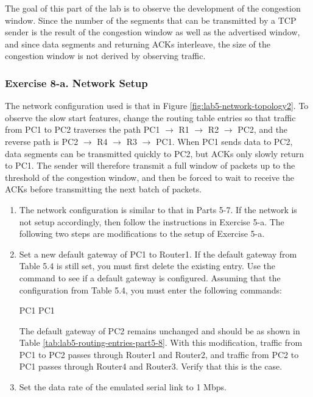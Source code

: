 The goal of this part of the lab is to observe the development of the congestion window. Since the number of the segments that can be transmitted by a TCP sender is the result of the congestion window as well as the advertised window, and since data segments and returning ACKs interleave, the size of the congestion window is not derived by observing traffic.

\subsubsection*{Exercise 8-a. Network Setup}

The network configuration used is that in Figure \ref{fig:lab5-network-topology2}. To observe the slow start features, change the routing table entries so that traffic from PC1 to PC2 traverses the path PC1 $\rightarrow$ R1 $\rightarrow$ R2 $\rightarrow$ PC2, and the reverse path is PC2 $\rightarrow$ R4 $\rightarrow$ R3 $\rightarrow$ PC1. When PC1 sends data to PC2, data segments can be transmitted quickly to PC2, but ACKs only slowly return to PC1. The sender will therefore transmit a full window of packets up to the threshold of the congestion window, and then be forced to wait to receive the ACKs before transmitting the next batch of packets.

\begin{enumerate}
	\item The network configuration is similar to that in Parts 5-7. If the network is not setup accordingly, then follow the instructions in Exercise 5-a. The following two steps are modifications to the setup of Exercise 5-a.
	\item Set a new default gateway of PC1 to Router1. If the default gateway from Table 5.4 is still set, you must first delete the existing entry. Use the command  to see if a default gateway is configured. Assuming that the configuration from Table 5.4, you must enter the following commands:
		\begin{cmdblock}
	PC1%
	PC1%
		\end{cmdblock}
		The default gateway of PC2 remains unchanged and should be as shown in Table \ref{tab:lab5-routing-entries-part5-8}.
		With this modification, traffic from PC1 to PC2 passes through Router1 and Router2, and traffic from PC2 to PC1 passes through Router4 and Router3. Verify that this is the case.
	\item Set the data rate of the emulated serial link to 1 Mbps.
\end{enumerate}

